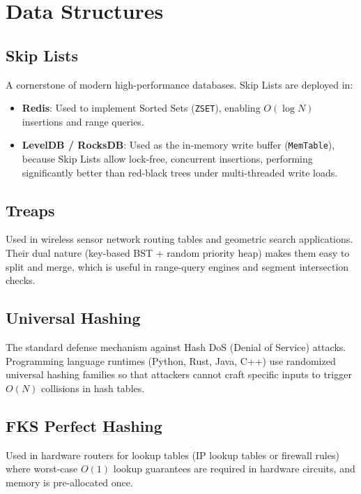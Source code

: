 \documentclass[twoside,12pt]{book}
\theoremstyle{plain}
\theoremstyle{definition}
\theoremstyle{remark}
\begin{document}
\section{Data Structures}

\subsection{Skip Lists}
A cornerstone of modern high-performance databases. Skip Lists are deployed in:
\begin{itemize}
    \item \textbf{Redis}: Used to implement Sorted Sets (\texttt{ZSET}), enabling $O(\log N)$ insertions and range queries.
    \item \textbf{LevelDB / RocksDB}: Used as the in-memory write buffer (\texttt{MemTable}), because Skip Lists allow lock-free, concurrent insertions, performing significantly better than red-black trees under multi-threaded write loads.
\end{itemize}

\subsection{Treaps}
Used in wireless sensor network routing tables and geometric search applications. Their 
dual nature (key-based BST + random priority heap) makes them easy to split and merge, 
which is useful in range-query engines and segment intersection checks.

\subsection{Universal Hashing}
The standard defense mechanism against Hash DoS (Denial of Service) attacks. Programming 
language runtimes (Python, Rust, Java, C++) use randomized universal hashing families 
so that attackers cannot craft specific inputs to trigger $O(N)$ collisions in hash tables.

\subsection{FKS Perfect Hashing}
Used in hardware routers for lookup tables (IP lookup tables or firewall rules) where 
worst-case $O(1)$ lookup guarantees are required in hardware circuits, and memory is 
pre-allocated once.

\end{document}
